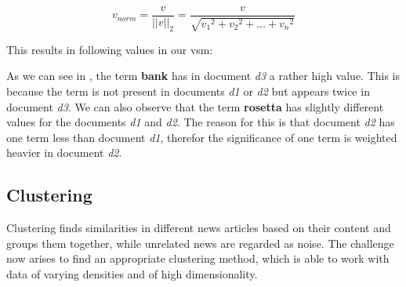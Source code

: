 \begin{equation}
    v_{norm} = \frac{v}{||v||_2} = \frac{v}{\sqrt{v_1{^2}+v_2{^2}+\ldots+v_n{^2}}}
    \label{equ:euclidean}
\end{equation}

This results in following values in our \Gls{vsm}:

\begin{table}[h]
    \centering
    \caption{tf-idf \Gls{vsm}.}
    \label{tab:tfidf_vsm}
\end{table}

As we can see in , the term \textbf{bank} has in document \textit{d3}
a rather high value.
This is because the term is not present in documents \textit{d1} or \textit{d2} but appears
twice in document \textit{d3}.
We can also observe that the term \textbf{rosetta} has slightly different values for the
documents \textit{d1} and \textit{d2}.
The reason for this is that document \textit{d2} has one term less than document \textit{d1},
therefor the significance of one term is weighted heavier in document \textit{d2}.

\subsection{Clustering}
\label{subsec:3_clustering}

Clustering finds similarities in different news articles based on their content and groups them together,
while unrelated news are regarded as noise.
The challenge now arises to find an appropriate clustering method,
which is able to work with data of varying densities and of high dimensionality.

